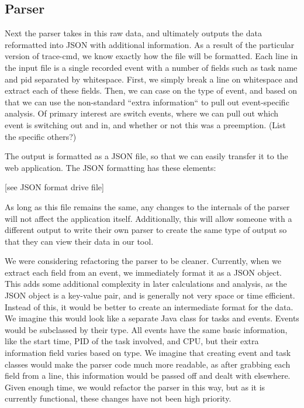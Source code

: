 \documentclass{hmcclinic}
\begin{document}
  \subsection{Parser}
  Next the parser takes in this raw data, and ultimately outputs the data
  reformatted into JSON with additional information. As a result of the
  particular version of trace-cmd, we know exactly how the file will be
  formatted. Each line in the input file is a single recorded event with a
  number of fields such as task name and pid separated by whitespace. First, we
  simply break a line on whitespace and extract each of these fields. Then, we
  can case on the type of event, and based on that we can use the non-standard
  ``extra information`` to pull out event-specific analysis. Of primary interest
  are switch events, where we can pull out which event is switching out and in,
  and whether or not this was a preemption. (List the specific others?)

  The output is formatted as a JSON file, so that we can easily transfer it to
  the web application. The JSON formatting has these elements:

  [see JSON format drive file]

  As long as this file remains the same, any changes to the internals of the
  parser will not affect the application itself. Additionally, this will allow
  someone with a different output to write their own parser to create the same
  type of output so that they can view their data in our tool.

  We were considering refactoring the parser to be cleaner. Currently, when we
  extract each field from an event, we immediately format it as a JSON object.
  This adds some additional complexity in later calculations and analysis, as
  the JSON object is a key-value pair, and is generally not very space or time
  efficient. Instead of this, it would be better to create an intermediate
  format for the data. We imagine this would look like a separate Java class for
  tasks and events. Events would be subclassed by their type. All events have
  the same basic information, like the start time, PID of the task involved, and
  CPU, but their extra information field varies based on type. We imagine that
  creating event and task classes would make the parser code much more readable,
  as after grabbing each field from a line, this information would be passed off
  and dealt with elsewhere. Given enough time, we would refactor the parser in
  this way, but as it is currently functional, these changes have not been high
  priority.
\end{document}
